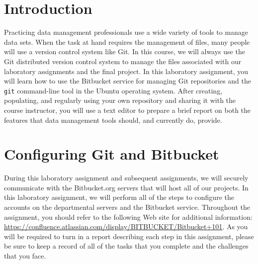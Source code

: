 


\usepackage[compact]{titlesec}



\section*{Introduction}

Practicing data management professionals use a wide variety of tools to manage data sets. When the task at hand requires
the management of files, many people will use a version control system like Git.  In this course, we will always use the
Git distributed version control system to manage the files associated with our laboratory assignments and the final
project.  In this laboratory assignment, you will learn how to use the Bitbucket service for managing Git repositories
and the {\tt git} command-line tool in the Ubuntu operating system. After creating, populating, and regularly using your
own repository and sharing it with the course instructor, you will use a text editor to prepare a brief report on both
the features that data management tools should, and currently do, provide.

\section*{Configuring Git and Bitbucket}

During this laboratory assignment and subsequent assignments, we will securely communicate with the Bitbucket.org
servers that will host all of our projects.  In this laboratory assignment, we will perform all of the steps to
configure the accounts on the departmental servers and the Bitbucket service.  Throughout the assignment, you should
refer to the following Web site for additional information:
\url{https://confluence.atlassian.com/display/BITBUCKET/Bitbucket+101}.  As you will be required to turn in a report
describing each step in this assignment, please be sure to keep a record of all of the tasks that you complete and the
challenges that you face.

